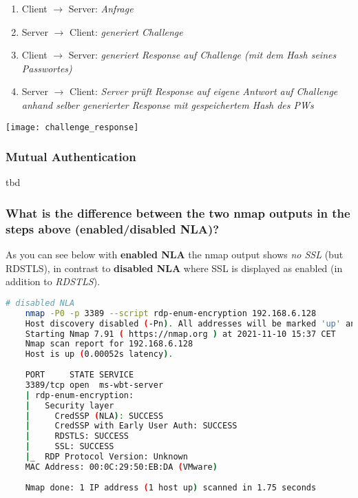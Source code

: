 \begin{minipage}{0.45\linewidth}
    \begin{enumerate}
        \item Client $\rightarrow$ Server: \textit{Anfrage}
        \item Server $\rightarrow$ Client: \textit{generiert Challenge}
        \item Client $\rightarrow$ Server: \textit{generiert Response auf Challenge (mit dem Hash seines Passwortes)}
        \item Server $\rightarrow$ Client: \textit{Server prüft Response auf eigene Antwort auf Challenge anhand selber generierter Response mit gespeichertem Hash des PWs}
    \end{enumerate}
\end{minipage}
\begin{minipage}{0.5\linewidth}
    \begin{center}
        \texttt{[image: challenge\_response]}
        \vspace{-8pt}
    \end{center}
\end{minipage}

\subsubsection{Mutual Authentication}
tbd

\subsubsection{What is the difference between the two nmap outputs in the steps above (enabled/disabled NLA)?}
As you can see below with \textbf{enabled NLA} the nmap output shows \textit{no SSL} (but RDSTLS), in contrast to \textbf{disabled NLA} where SSL is displayed as enabled (in addition to \textit{RDSTLS}).

\begin{lstlisting}[language=bash]
    # disabled NLA
    nmap -P0 -p 3389 --script rdp-enum-encryption 192.168.6.128
    Host discovery disabled (-Pn). All addresses will be marked 'up' and scan times will be slower.
    Starting Nmap 7.91 ( https://nmap.org ) at 2021-11-10 15:37 CET
    Nmap scan report for 192.168.6.128
    Host is up (0.00052s latency).
    
    PORT     STATE SERVICE
    3389/tcp open  ms-wbt-server
    | rdp-enum-encryption:
    |   Security layer
    |     CredSSP (NLA): SUCCESS
    |     CredSSP with Early User Auth: SUCCESS
    |     RDSTLS: SUCCESS
    |     SSL: SUCCESS
    |_  RDP Protocol Version: Unknown
    MAC Address: 00:0C:29:50:EB:DA (VMware)
    
    Nmap done: 1 IP address (1 host up) scanned in 1.75 seconds
\end{lstlisting}


